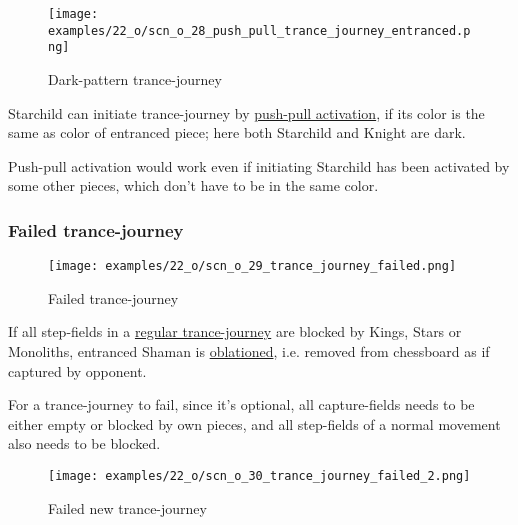 \clearpage %

\vspace*{-2.1\baselineskip}
\noindent
\begin{figure}[!h]
\texttt{[image: examples/22\_o/scn\_o\_28\_push\_pull\_trance\_journey\_entranced.png]}
\caption{Dark-pattern trance-journey}
\label{fig:scn_o_28_push_pull_trance_journey_entranced}
\end{figure}

Starchild can initiate trance-journey by
\hyperref[sec:Terms/Push-pull activation]{push-pull activation},
if its color is the same as color of entranced piece; here both Starchild and Knight
are dark.

Push-pull activation would work even if initiating Starchild has been activated by
some other pieces, which don't have to be in the same color.

\clearpage %

\subsubsection*{Failed trance-journey}
\label{sec:One/Starchild/Trance-journey/Failed trance-journey}

\vspace*{-1.1\baselineskip}
\noindent
\begin{figure}[!h]
\texttt{[image: examples/22\_o/scn\_o\_29\_trance\_journey\_failed.png]}
\caption{Failed trance-journey}
\label{fig:scn_o_29_trance_journey_failed}
\end{figure}

If all step-fields in a
\hyperref[fig:scn_cot_09_trance_journey_init]{regular trance-journey}
are blocked by Kings, Stars or Monoliths, entranced Shaman is
\hyperref[sec:Terms/Oblation]{oblationed}, i.e. removed from chessboard
as if captured by opponent.

For a trance-journey to fail, since it's optional, all capture-fields needs
to be either empty or blocked by own pieces, and all step-fields of a normal
movement also needs to be blocked.

\clearpage %

\vspace*{-2.1\baselineskip}
\noindent
\begin{figure}[!h]
\texttt{[image: examples/22\_o/scn\_o\_30\_trance\_journey\_failed\_2.png]}
\caption{Failed new trance-journey}
\label{fig:scn_o_30_trance_journey_failed_2}
\end{figure}

